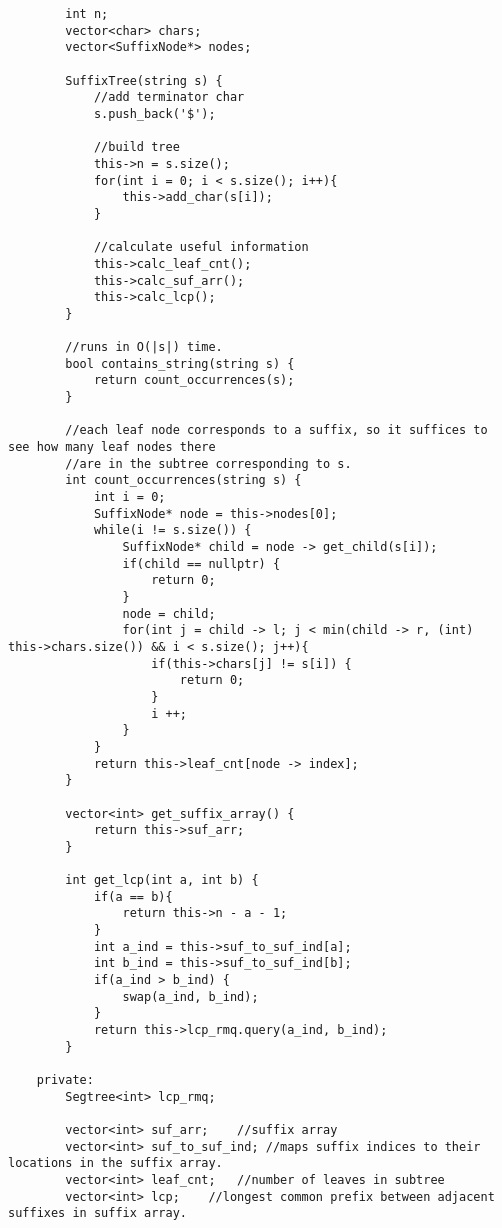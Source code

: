 \documentclass[8pt, headheight=10pt, a4paper]{article}
\begin{document}
\begin{multicols*}{3}
\begin{lstlisting}
        int n;
        vector<char> chars;
        vector<SuffixNode*> nodes;

        SuffixTree(string s) {
            //add terminator char
            s.push_back('$');

            //build tree
            this->n = s.size();
            for(int i = 0; i < s.size(); i++){
                this->add_char(s[i]);
            }

            //calculate useful information
            this->calc_leaf_cnt();
            this->calc_suf_arr();
            this->calc_lcp();
        }

        //runs in O(|s|) time. 
        bool contains_string(string s) {
            return count_occurrences(s);
        }

        //each leaf node corresponds to a suffix, so it suffices to see how many leaf nodes there
        //are in the subtree corresponding to s. 
        int count_occurrences(string s) {
            int i = 0;
            SuffixNode* node = this->nodes[0];
            while(i != s.size()) {
                SuffixNode* child = node -> get_child(s[i]);
                if(child == nullptr) {
                    return 0;
                }
                node = child;
                for(int j = child -> l; j < min(child -> r, (int) this->chars.size()) && i < s.size(); j++){
                    if(this->chars[j] != s[i]) {
                        return 0;
                    }
                    i ++;
                }
            }
            return this->leaf_cnt[node -> index];
        }
        
        vector<int> get_suffix_array() {
            return this->suf_arr;
        }

        int get_lcp(int a, int b) {
            if(a == b){
                return this->n - a - 1;
            }
            int a_ind = this->suf_to_suf_ind[a];
            int b_ind = this->suf_to_suf_ind[b];
            if(a_ind > b_ind) {
                swap(a_ind, b_ind);
            }
            return this->lcp_rmq.query(a_ind, b_ind);
        }

    private:
        Segtree<int> lcp_rmq;

        vector<int> suf_arr;    //suffix array
        vector<int> suf_to_suf_ind; //maps suffix indices to their locations in the suffix array. 
        vector<int> leaf_cnt;   //number of leaves in subtree
        vector<int> lcp;    //longest common prefix between adjacent suffixes in suffix array. 


\end{lstlisting}
\end{multicols*}
\end{document}

